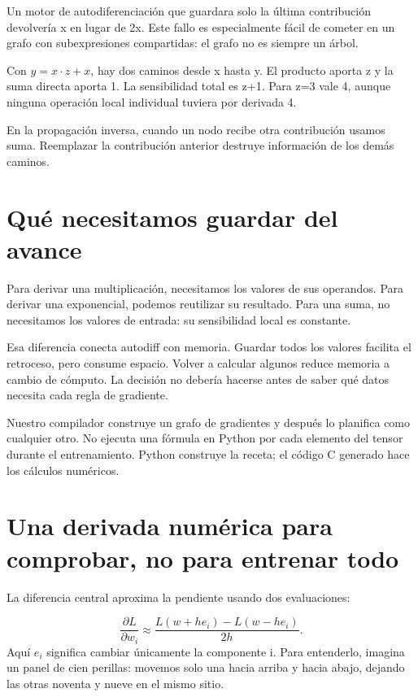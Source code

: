 \documentclass[12pt,a4paper,oneside]{report}
\begin{document}
Un motor de autodiferenciación que guardara solo la última contribución devolvería x en lugar de 2x. Este fallo es especialmente fácil de cometer en un grafo con subexpresiones compartidas: el grafo no es siempre un árbol.

Con $y=x\cdot z+x$, hay dos caminos desde x hasta y. El producto aporta z y la suma directa aporta 1. La sensibilidad total es z+1. Para z=3 vale 4, aunque ninguna operación local individual tuviera por derivada 4.

\begin{cuidado}
En la propagación inversa, cuando un nodo recibe otra contribución usamos suma. Reemplazar la contribución anterior destruye información de los demás caminos.

\end{cuidado}
\section{Qué necesitamos guardar del avance}
Para derivar una multiplicación, necesitamos los valores de sus operandos. Para derivar una exponencial, podemos reutilizar su resultado. Para una suma, no necesitamos los valores de entrada: su sensibilidad local es constante.

Esa diferencia conecta autodiff con memoria. Guardar todos los valores facilita el retroceso, pero consume espacio. Volver a calcular algunos reduce memoria a cambio de cómputo. La decisión no debería hacerse antes de saber qué datos necesita cada regla de gradiente.

Nuestro compilador construye un grafo de gradientes y después lo planifica como cualquier otro. No ejecuta una fórmula en Python por cada elemento del tensor durante el entrenamiento. Python construye la receta; el código C generado hace los cálculos numéricos.

\section{Una derivada numérica para comprobar, no para entrenar todo}
La diferencia central aproxima la pendiente usando dos evaluaciones:

\[
\frac{\partial L}{\partial w_i}\approx
\frac{L(w+h e_i)-L(w-h e_i)}{2h}.
\]
Aquí $e_i$ significa cambiar únicamente la componente i. Para entenderlo, imagina un panel de cien perillas: movemos solo una hacia arriba y hacia abajo, dejando las otras noventa y nueve en el mismo sitio.
\end{document}
